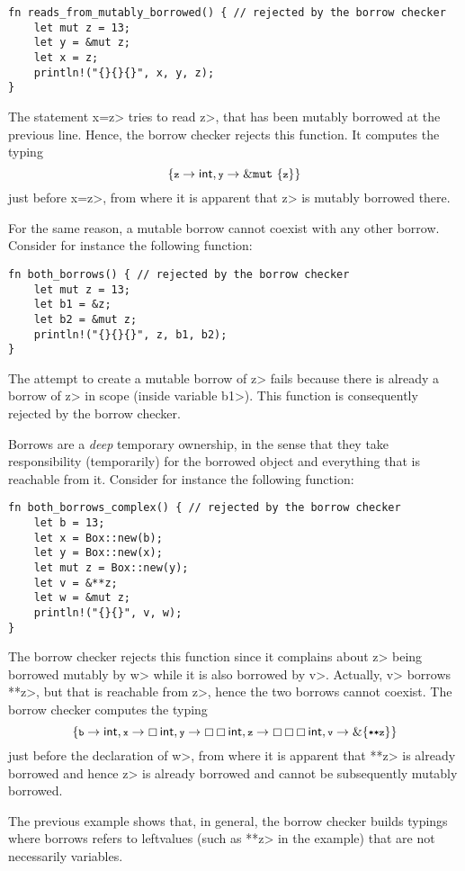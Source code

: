 \begin{verbatim}
fn reads_from_mutably_borrowed() { // rejected by the borrow checker
    let mut z = 13;
    let y = &mut z;
    let x = z;
    println!("{}{}{}", x, y, z);
}
\end{verbatim}

\noindent
The statement \<x=z> tries to read \<z>, that has been mutably borrowed
at the previous line. Hence, the borrow checker rejects this function.
It computes the typing
\[
\{\<z>\to\mathsf{int},\<y>\to\mutborrow\{\<z>\}\}
\]
just before \<x=z>, from where it is apparent that \<z> is mutably borrowed there.

For the same reason, a mutable borrow cannot coexist with any other borrow. Consider for instance
the following function:

\begin{verbatim}
fn both_borrows() { // rejected by the borrow checker
    let mut z = 13;
    let b1 = &z;
    let b2 = &mut z;
    println!("{}{}{}", z, b1, b2);
}
\end{verbatim}

\noindent
The attempt to create a mutable borrow of \<z> fails because there is already a borrow of \<z>
in scope (inside variable \<b1>). This function is consequently rejected by the borrow checker.

Borrows are a \emph{deep} temporary ownership, in the sense that they take
responsibility (temporarily) for the borrowed object and everything that is reachable from it.
Consider for instance the following function:

\begin{verbatim}
fn both_borrows_complex() { // rejected by the borrow checker
    let b = 13;
    let x = Box::new(b);
    let y = Box::new(x);
    let mut z = Box::new(y);
    let v = &**z;
    let w = &mut z;
    println!("{}{}", v, w);
}
\end{verbatim}

\noindent
The borrow checker rejects this function since it complains about
\<z> being borrowed mutably by \<w> while it is also borrowed by \<v>.
Actually, \<v> borrows \<**z>, but that is reachable from \<z>, hence
the two borrows cannot coexist.
The borrow checker computes the typing
\[
\{\<b>\to\mathsf{int},\<x>\to\boxtype{\mathsf{int}},\<y>\to\boxtype{\boxtype{\mathsf{int}}},
\<z>\to\boxtype{\boxtype{\boxtype{\mathsf{int}}}},\<v>\to\borrow\{\<**z>\}\}
\]
just before the declaration of \<w>, from where it is apparent that \<**z> is
already borrowed and hence \<z> is already borrowed and cannot be subsequently mutably borrowed.

The previous example shows that, in general, the borrow checker builds typings
where borrows refers to leftvalues (such as \<**z> in the example) that are not necessarily variables.

